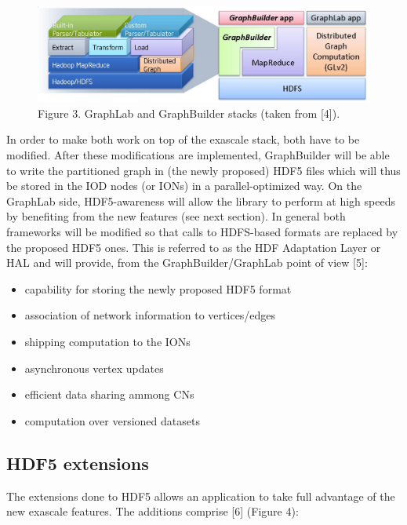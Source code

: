 \documentclass[conference]{IEEEtran}
\begin{document}
\begin{figure}[htbp]
\centering
\includegraphics[scale=0.15]{images/graphlab-and-graphbuilder.png}
\caption{Figure 3. GraphLab and GraphBuilder stacks (taken from
{[}4{]}).}
\end{figure}

In order to make both work on top of the exascale stack, both have to be
modified. After these modifications are implemented, GraphBuilder will
be able to write the partitioned graph in (the newly proposed) HDF5
files which will thus be stored in the IOD nodes (or IONs) in a
parallel-optimized way. On the GraphLab side, HDF5-awareness will allow
the library to perform at high speeds by benefiting from the new
features (see next section). In general both frameworks will be modified
so that calls to HDFS-based formats are replaced by the proposed HDF5
ones. This is referred to as the HDF Adaptation Layer or HAL and will
provide, from the GraphBuilder/GraphLab point of view {[}5{]}:

\begin{itemize}
\itemsep1pt\parskip0pt
\item
  capability for storing the newly proposed HDF5 format
\item
  association of network information to vertices/edges
\item
  shipping computation to the IONs
\item
  asynchronous vertex updates
\item
  efficient data sharing ammong CNs
\item
  computation over versioned datasets
\end{itemize}

\subsection{HDF5 extensions}\label{hdf5-extensions}

The extensions done to HDF5 allows an application to take full advantage
of the new exascale features. The additions comprise {[}6{]} (Figure 4):
\end{document}
